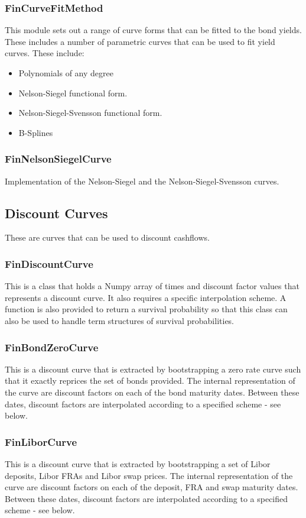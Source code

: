 \documentclass[twoside,11pt]{book}
\begin{document}
\subsubsection*{FinCurveFitMethod}
This module sets out a range of curve forms that can be fitted to the bond yields. These includes a number of parametric curves that can be used to fit yield curves. These include:
\begin{itemize}
\item{ Polynomials of any degree 
}
\item{ Nelson-Siegel functional form. 
}
\item{ Nelson-Siegel-Svensson functional form.
}
\item{ B-Splines
}
\end{itemize}


\subsubsection*{FinNelsonSiegelCurve}
Implementation of the Nelson-Siegel and the Nelson-Siegel-Svensson curves.


\subsection*{Discount Curves}
These are curves that can be used to discount cashflows.


\subsubsection*{FinDiscountCurve}
This is a class that holds a Numpy array of times and discount factor values that represents a discount curve. It also requires a specific interpolation scheme. A function is also provided to return a survival probability so that this class can also be used to handle term structures of survival probabilities.


\subsubsection*{FinBondZeroCurve}
This is a discount curve that is extracted by bootstrapping a zero rate curve such that it exactly reprices the set of bonds provided. The internal representation of the curve are discount factors on each of the bond maturity dates. Between these dates, discount factors are interpolated according to a specified scheme - see below.


\subsubsection*{FinLiborCurve}
This is a discount curve that is extracted by bootstrapping a set of Libor deposits, Libor FRAs and Libor swap prices. The internal representation of the curve are discount factors on each of the deposit, FRA and swap maturity dates. Between these dates, discount factors are interpolated according to a specified scheme - see below.
\end{document}

